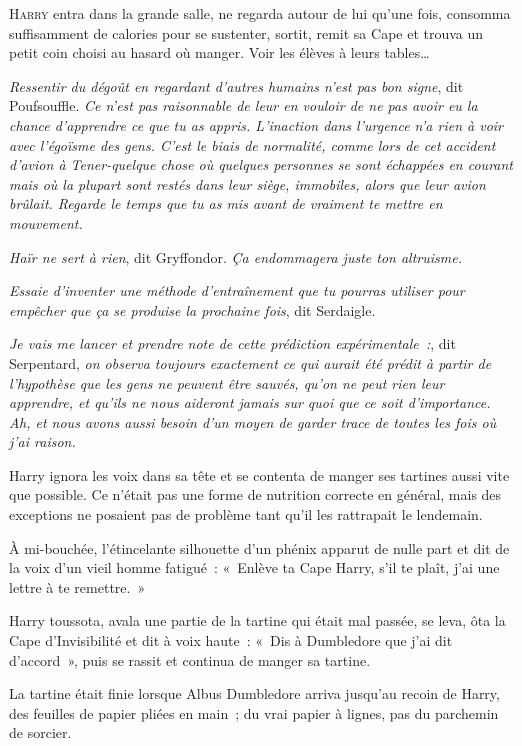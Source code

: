 
\lettrine{H}{arry} entra dans la grande salle, ne regarda autour de lui qu'une fois, consomma suffisamment de calories pour se sustenter, sortit, remit sa Cape et trouva un petit coin choisi au hasard où manger. Voir les élèves à leurs tables…

\emph{Ressentir du dégoût en regardant d'autres humains n'est pas bon signe}, dit Poufsouffle. \emph{Ce n'est pas raisonnable de leur en vouloir de ne pas avoir eu la chance d'apprendre ce que tu as appris. L'inaction dans l'urgence n'a rien à voir avec l'égoïsme des gens. C'est le biais de normalité, comme lors de cet accident d'avion à Tener-quelque chose où quelques personnes se sont échappées en courant mais où la plupart sont restés dans leur siège, immobiles, alors que leur avion brûlait. Regarde le temps que tu as mis avant de vraiment te mettre en mouvement.}

\emph{Haïr ne sert à rien}, dit Gryffondor. \emph{Ça endommagera juste ton altruisme.}

\emph{Essaie d'inventer une méthode d'entraînement que tu pourras utiliser pour empêcher que ça se produise la prochaine fois}, dit Serdaigle.

\emph{Je vais me lancer et prendre note de cette prédiction expérimentale~:}, dit Serpentard, \emph{on observa toujours exactement ce qui aurait été prédit à partir de l'hypothèse que les gens ne peuvent être sauvés, qu'on ne peut rien leur apprendre, et qu'ils ne nous aideront jamais sur quoi que ce soit d'importance. Ah, et nous avons aussi besoin d'un moyen de garder trace de toutes les fois où j'ai raison.}

Harry ignora les voix dans sa tête et se contenta de manger ses tartines aussi vite que possible. Ce n'était pas une forme de nutrition correcte en général, mais des exceptions ne posaient pas de problème tant qu'il les rattrapait le lendemain.

À mi-bouchée, l'étincelante silhouette d'un phénix apparut de nulle part et dit de la voix d'un vieil homme fatigué~: «~Enlève ta Cape Harry, s'il te plaît, j'ai une lettre à te remettre.~»

Harry toussota, avala une partie de la tartine qui était mal passée, se leva, ôta la Cape d'Invisibilité et dit à voix haute~: «~Dis à Dumbledore que j'ai dit d'accord~», puis se rassit et continua de manger sa tartine.

La tartine était finie lorsque Albus Dumbledore arriva jusqu'au recoin de Harry, des feuilles de papier pliées en main~; du vrai papier à lignes, pas du parchemin de sorcier.

